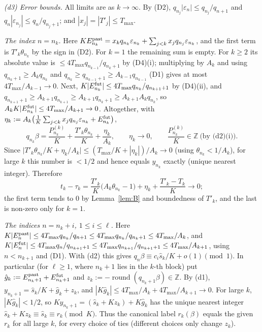 \documentclass[11pt]{amsart}
\theoremstyle{definition}
\theoremstyle{remark}
\newcommand{\Z}{\mathbb{Z}}
\newcommand{\rnd}{\operatorname{round}}
\begin{document}
\emph{(d3) Error bounds.} All limits are as $k\to\infty$. By (D2), $q_{n_j}|\varepsilon_n|\le q_{n_j}/q_{n+1}$ and
$q_n|\varepsilon_{n_j}|\le q_n/q_{n_j+1}$; and $|x_j|=|T'_j|\le T_{\max}$.

\noindent\emph{The index $n=n_k$.} Here
$KE^{\rm past}_{n_k}=x_kq_{n_k}\varepsilon_{n_k}+\sum_{j<k}x_jq_{n_j}\varepsilon_{n_k}$, and the first term is
$T'_k\theta_{n_k}$ by the sign in (D2). For $k=1$ the remaining sum is empty. For $k\ge2$ its absolute value
is $\le4T_{\max}q_{n_{k-1}}/q_{n_k+1}$ by (D4)(i); multiplying by $A_k$ and using $q_{n_k+1}\ge A_kq_{n_k}$ and
$q_{n_k}\ge q_{n_{k-1}+1}\ge A_{k-1}q_{n_{k-1}}$ (D1) gives at most $4T_{\max}/A_{k-1}\to0$. Next,
$K|E^{\rm fut}_{n_k}|\le4T_{\max}q_{n_k}/q_{n_{k+1}+1}$ by (D4)(ii), and
$q_{n_{k+1}+1}\ge A_{k+1}q_{n_{k+1}}\ge A_{k+1}q_{n_k+1}\ge A_{k+1}A_kq_{n_k}$, so $A_kK|E^{\rm fut}_{n_k}|\le4T_{\max}/A_{k+1}\to0$.
Altogether, with $\eta_k:=A_k\bigl(\frac1K\sum_{j<k}x_jq_{n_j}\varepsilon_{n_k}+E^{\rm fut}_{n_k}\bigr)$,
\[
q_{n_k}\beta=\frac{P^{(k)}_{n_k}}K+\frac{T'_k\theta_{n_k}}K+\frac{\eta_k}{A_k},\qquad\eta_k\to0,\qquad
\frac{P^{(k)}_{n_k}}K\in\Z\ \text{(by (d2)(i))}.
\]
Since $\bigl|T'_k\theta_{n_k}/K+\eta_k/A_k\bigr|\le(T_{\max}/K+|\eta_k|)/A_k\to0$ (using $\theta_{n_k}<1/A_k$), for large $k$
this number is $<1/2$ and hence equals $y_{n_k}$ exactly (unique nearest integer). Therefore
\[
t_k-\tau_k=\frac{T'_k}K\bigl(A_k\theta_{n_k}-1\bigr)+\eta_k+\frac{T'_k-T_k}K\to0;
\]
the first term tends to $0$ by Lemma~\ref{lem:B} and boundedness of $T'_k$, and the last is non-zero only for
$k=1$.

\noindent\emph{The indices $n=n_k+i$, $1\le i\le\ell$.} Here
$K|E^{\rm past}_n|\le4T_{\max}q_{n_k}/q_{n+1}\le4T_{\max}q_{n_k}/q_{n_k+1}\le4T_{\max}/A_k$, and
$K|E^{\rm fut}_n|\le4T_{\max}q_n/q_{n_{k+1}+1}\le4T_{\max}q_{n_{k+1}}/q_{n_{k+1}+1}\le4T_{\max}/A_{k+1}$, using
$n<n_{k+1}$ and (D1). With (d2) this gives $q_n\beta\equiv c_i\hat s_k/K+o(1)\pmod1$. In particular (for $\ell\ge1$,
where $n_k+1$ lies in the $k$-th block) put $\hat g_k:=E^{\rm past}_{n_k+1}+E^{\rm fut}_{n_k+1}$ and
$z_k:=-\rnd(q_{n_k+1}\beta)\in\Z$. By (d1), $y_{n_k+1}=\hat s_k/K+\hat g_k+z_k$, and
$|K\hat g_k|\le4T_{\max}/A_k+4T_{\max}/A_{k+1}\to0$. For large $k$, $|K\hat g_k|<1/2$, so
$Ky_{n_k+1}=(\hat s_k+Kz_k)+K\hat g_k$ has the unique nearest integer $\hat s_k+Kz_k\equiv\hat s_k\equiv r_k\pmod K$. Thus
the canonical label $r_k(\beta)$ equals the given $r_k$ for all large $k$, for every choice of ties (different
choices only change $z_k$).
\end{document}
